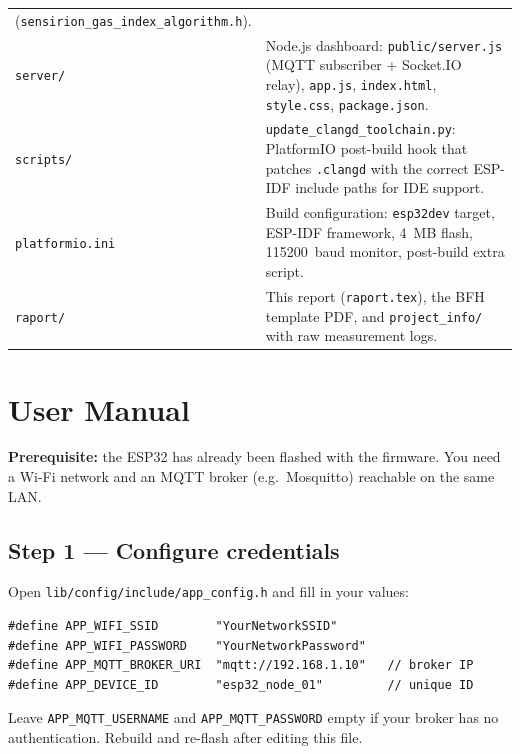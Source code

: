 \documentclass[11pt,a4paper]{article}
\begin{document}
{\begin{longtable}{@{}p{3.5cm}p{12.2cm}@{}}
  (\texttt{sensirion\_gas\_index\_algorithm.h}). \\
\texttt{server/} & Node.js dashboard: \texttt{public/server.js} (MQTT subscriber +
  Socket.IO relay), \texttt{app.js}, \texttt{index.html}, \texttt{style.css},
  \texttt{package.json}. \\
\texttt{scripts/} & \texttt{update\_clangd\_toolchain.py}: PlatformIO post-build hook that
  patches \texttt{.clangd} with the correct ESP-IDF include paths for IDE support. \\
\texttt{platformio.ini} & Build configuration: \texttt{esp32dev} target, ESP-IDF framework,
  4~MB flash, 115200~baud monitor, post-build extra script. \\
\texttt{raport/} & This report (\texttt{raport.tex}), the BFH template PDF,
  and \texttt{project\_info/} with raw measurement logs. \\
\bottomrule
\end{longtable}

}

\newpage
\section{User Manual}
\vspace{10pt}

\begin{mdframed}[style=infoboxstyle]
\textbf{Prerequisite:} the ESP32 has already been flashed with the firmware.
You need a Wi-Fi network and an MQTT broker (e.g.\ Mosquitto) reachable on the same LAN.
\end{mdframed}

\subsection{Step 1 --- Configure credentials}

Open \texttt{lib/config/include/app\_config.h} and fill in your values:

\begin{verbatim}
#define APP_WIFI_SSID        "YourNetworkSSID"
#define APP_WIFI_PASSWORD    "YourNetworkPassword"
#define APP_MQTT_BROKER_URI  "mqtt://192.168.1.10"   // broker IP
#define APP_DEVICE_ID        "esp32_node_01"         // unique ID
\end{verbatim}

Leave \texttt{APP\_MQTT\_USERNAME} and \texttt{APP\_MQTT\_PASSWORD} empty if your broker has no
authentication. Rebuild and re-flash after editing this file.
\end{document}

